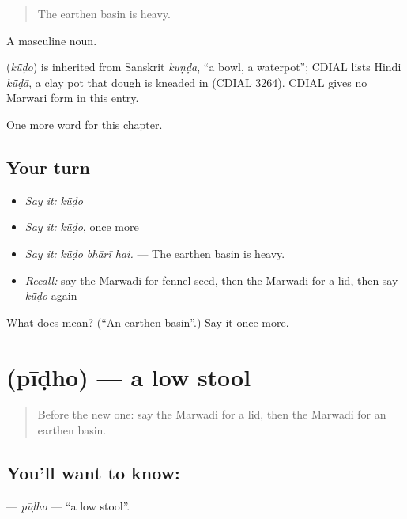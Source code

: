 \begin{quote}
The earthen basin is heavy.
\end{quote}

A masculine noun.

\begin{cousinweb}
\textbf{} (\emph{kū̃ḍo}) is inherited from Sanskrit \emph{kuṇḍa}, \textquotedblleft{}a bowl, a waterpot\textquotedblright{}; CDIAL lists Hindi \emph{kū̃ḍā}, a clay pot that dough is kneaded in (CDIAL 3264). CDIAL gives no Marwari form in this entry.
\end{cousinweb}

\begin{grammarlens}[title={What you've built}]
One more word for this chapter.
\end{grammarlens}

\subsection*{Your turn}
\begin{itemize}
\raggedright
  \item \emph{Say it:} \emph{kū̃ḍo}
  \item \emph{Say it:} \emph{kū̃ḍo}, once more
  \item \emph{Say it:} \emph{kū̃ḍo bhārī hai.} — The earthen basin is heavy.
  \item \emph{Recall:} say the Marwadi for fennel seed, then the Marwadi for a lid, then say \emph{kū̃ḍo} again
\end{itemize}

\begin{tcolorbox}[breakable,colback=teal!4,colframe=teal!35!black,title={Before you move on}]
What does  mean? (\textquotedblleft{}An earthen basin\textquotedblright{}.) Say it once more.
\end{tcolorbox}
\section[\texorpdfstring{\mw{पीढो} (pīḍho)}{पीढो (pīḍho)}]{ (pīḍho) — a low stool}

\label{lesson:MW-C186-pidho}



\begin{quote}
Before the new one: say the Marwadi for a lid, then the Marwadi for an earthen basin.
\end{quote}

\subsection*{You'll want to know: }
\textbf{} — \emph{pīḍho} — \textquotedblleft{}a low stool\textquotedblright{}.

